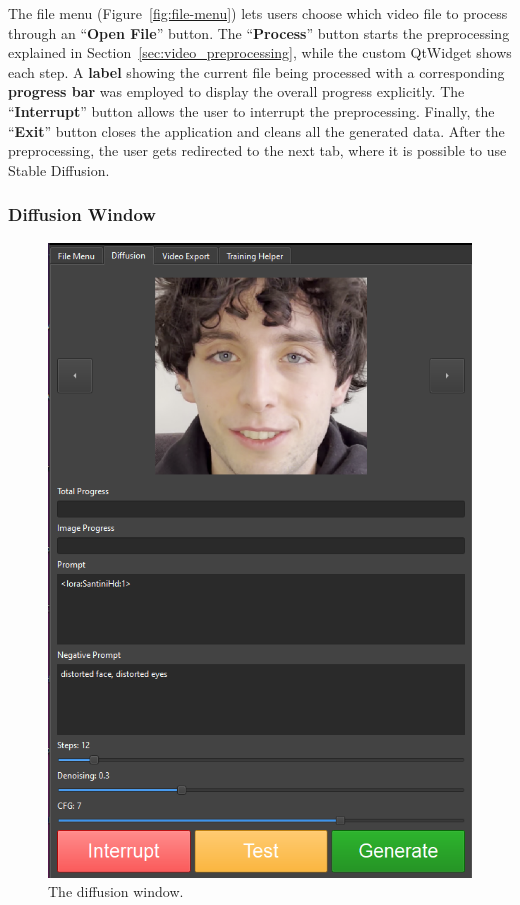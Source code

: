 \documentclass[preprint]{elsarticle}
\begin{document}
The file menu (Figure~\ref{fig:file-menu}) lets users choose which video file to process through 
an ``\textbf{Open File}'' button. 
The ``\textbf{Process}'' button starts the preprocessing explained in Section~\ref{sec:video_preprocessing}, 
while the custom QtWidget shows each step. 
A \textbf{label} showing the current file being processed with a corresponding \textbf{progress bar} 
was employed to display the overall progress explicitly. 
The ``\textbf{Interrupt}'' button allows the user to interrupt the preprocessing. 
Finally, the ``\textbf{Exit}'' button closes the application and cleans all the generated data. 
After the preprocessing, the user gets redirected to the next tab,
where it is possible to use Stable Diffusion. 



\subsubsection{Diffusion Window}

\begin{figure}[H]
	\centering
	\includegraphics[scale=0.5, keepaspectratio]{img/project_img/generation-window.png}
	\caption{The diffusion window.}
	\label{fig:diffusion-menu}
\end{figure}
\end{document}
